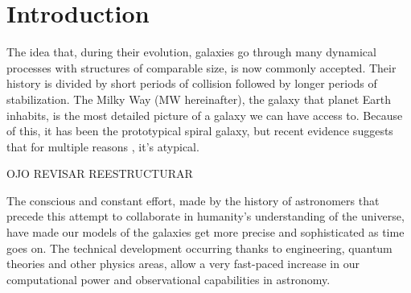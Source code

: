 \chapter{Introduction}

The idea that, during their evolution, galaxies go through many dynamical processes with structures of comparable size, is now commonly accepted. Their history is divided by short periods of collision followed by longer periods of stabilization. The Milky Way (MW hereinafter), the galaxy that planet Earth inhabits, is the most detailed picture of a galaxy we can have access to. Because of this, it has been the prototypical spiral galaxy, but recent evidence suggests that for multiple reasons  \cite{Cautun_2018}, it's atypical.

OJO REVISAR REESTRUCTURAR

The conscious and constant effort, made by the history of astronomers that precede this attempt to collaborate in humanity's understanding of the universe, have made our models of the galaxies get more precise and sophisticated as time goes on. The technical development occurring thanks to engineering, quantum theories and other physics areas, allow a very fast-paced increase in our computational power and observational capabilities in astronomy.